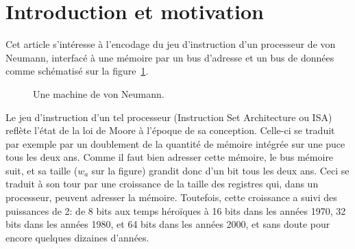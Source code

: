 \documentclass[architecture]{compas2018}
\begin{document}
\section{Introduction et motivation}
Cet article s'intéresse à l'encodage du jeu d'instruction d'un processeur de von Neumann, interfacé à une mémoire par un bus d'adresse et un bus de données comme schématisé sur la figure~\ref{fig:mvn}.

\newcommand{\figVonNeumann}{
}

\begin{figure}[ht]
  \begin{center}
    \figVonNeumann
  \end{center}
  \caption{Une machine de von Neumann.}
  \label{fig:mvn} 
\end{figure}

Le jeu d'instruction d'un tel processeur (Instruction Set Architecture ou ISA) reflète l'état de la loi de Moore à l'époque de sa conception.
Celle-ci se traduit par exemple par un doublement de la quantité de mémoire intégrée sur une puce tous les deux ans.
Comme il faut bien adresser cette mémoire, le bus mémoire suit, et sa taille ($w_a$ sur la figure) grandit donc d'un bit tous les deux ans.
Ceci se traduit à son tour par une croissance de la taille des registres qui, dans un processeur, peuvent adresser la mémoire.
Toutefois, cette croissance a suivi des puissances de 2: de 8 bits aux temps héroïques à 16 bits dans les années 1970, 32 bits dans les années 1980, et 64 bits dans les années 2000, et sans doute pour encore quelques dizaines d'années.
\end{document}
